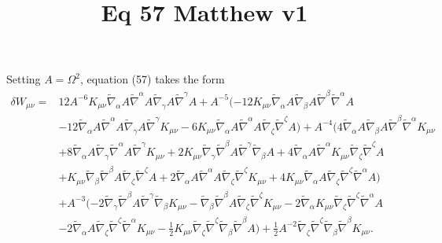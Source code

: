 \documentclass[10pt,letterpaper]{article}
\title{Eq 57 Matthew v1}
\date{}
\begin{document}
\maketitle
\noindent
Setting $A = \Omega^2$, equation (57) takes the form
\begin{align}
\delta W_{\mu\nu}={}&12 A^{-6} K_{\mu \nu} \tilde{\nabla}_{\alpha}A \tilde{\nabla}^{\alpha}A \tilde{\nabla}_{\gamma}A \tilde{\nabla}^{\gamma}A
 + A^{-5} (-12 K_{\mu \nu} \tilde{\nabla}_{\alpha}A \tilde{\nabla}_{\beta}A \tilde{\nabla}^{\beta}\tilde{\nabla}^{\alpha}A\nonumber\\
& - 12 \tilde{\nabla}_{\alpha}A \tilde{\nabla}^{\alpha}A \tilde{\nabla}_{\gamma}A \tilde{\nabla}^{\gamma}K_{\mu \nu}
 - 6 K_{\mu \nu} \tilde{\nabla}_{\alpha}A \tilde{\nabla}^{\alpha}A \tilde{\nabla}_{\zeta}\tilde{\nabla}^{\zeta}A)
 + A^{-4} (4 \tilde{\nabla}_{\alpha}A \tilde{\nabla}_{\beta}A \tilde{\nabla}^{\beta}\tilde{\nabla}^{\alpha}K_{\mu \nu}\nonumber\\
& + 8 \tilde{\nabla}_{\alpha}A \tilde{\nabla}_{\gamma}\tilde{\nabla}^{\alpha}A \tilde{\nabla}^{\gamma}K_{\mu \nu}
 + 2 K_{\mu \nu} \tilde{\nabla}_{\gamma}\tilde{\nabla}^{\beta}A \tilde{\nabla}^{\gamma}\tilde{\nabla}_{\beta}A
 + 4 \tilde{\nabla}_{\alpha}A \tilde{\nabla}^{\alpha}K_{\mu \nu} \tilde{\nabla}_{\zeta}\tilde{\nabla}^{\zeta}A\nonumber\\
& + K_{\mu \nu} \tilde{\nabla}_{\beta}\tilde{\nabla}^{\beta}A \tilde{\nabla}_{\zeta}\tilde{\nabla}^{\zeta}A
 + 2 \tilde{\nabla}_{\alpha}A \tilde{\nabla}^{\alpha}A \tilde{\nabla}_{\zeta}\tilde{\nabla}^{\zeta}K_{\mu \nu}
 + 4 K_{\mu \nu} \tilde{\nabla}_{\alpha}A \tilde{\nabla}_{\zeta}\tilde{\nabla}^{\zeta}\tilde{\nabla}^{\alpha}A)\nonumber\\
& + A^{-3} (-2 \tilde{\nabla}_{\gamma}\tilde{\nabla}^{\beta}A \tilde{\nabla}^{\gamma}\tilde{\nabla}_{\beta}K_{\mu \nu}
 -  \tilde{\nabla}_{\beta}\tilde{\nabla}^{\beta}A \tilde{\nabla}_{\zeta}\tilde{\nabla}^{\zeta}K_{\mu \nu}
 - 2 \tilde{\nabla}_{\alpha}K_{\mu \nu} \tilde{\nabla}_{\zeta}\tilde{\nabla}^{\zeta}\tilde{\nabla}^{\alpha}A\nonumber\\
& - 2 \tilde{\nabla}_{\alpha}A \tilde{\nabla}_{\zeta}\tilde{\nabla}^{\zeta}\tilde{\nabla}^{\alpha}K_{\mu \nu}
 -  \tfrac{1}{2} K_{\mu \nu} \tilde{\nabla}_{\zeta}\tilde{\nabla}^{\zeta}\tilde{\nabla}_{\beta}\tilde{\nabla}^{\beta}A)
 + \tfrac{1}{2} A^{-2} \tilde{\nabla}_{\zeta}\tilde{\nabla}^{\zeta}\tilde{\nabla}_{\beta}\tilde{\nabla}^{\beta}K_{\mu \nu}.
\end{align}
\end{document}
